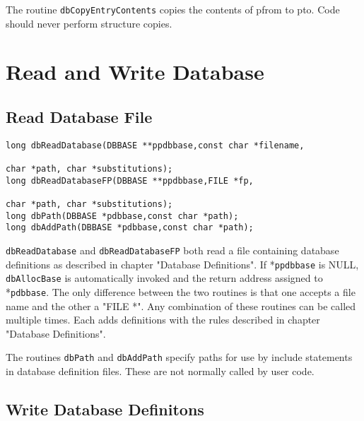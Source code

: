 The routine \verb|dbCopyEntryContents| copies the contents of pfrom to pto. Code should never perform structure copies.

\section{Read and Write Database}

\subsection{Read Database File}

\begin{verbatim}long dbReadDatabase(DBBASE **ppdbbase,const char *filename,

char *path, char *substitutions);
long dbReadDatabaseFP(DBBASE **ppdbbase,FILE *fp,

char *path, char *substitutions);
long dbPath(DBBASE *pdbbase,const char *path);
long dbAddPath(DBBASE *pdbbase,const char *path);

\end{verbatim}
\verb|dbReadDatabase| and \verb|dbReadDatabaseFP| both read a file containing database definitions as described in chapter 
"Database Definitions". If *\verb|ppdbbase| is NULL, \verb|dbAllocBase| is automatically invoked and the return address 
assigned to *\verb|pdbbase|. The only difference between the two routines is that one accepts a file name and the other a 
"FILE *". Any combination of these routines can be called multiple times. Each adds definitions with the rules described 
in chapter "Database Definitions".

The routines \verb|dbPath| and \verb|dbAddPath| specify paths for use by include statements in database definition files. These are 
not normally called by user code.

\subsection{Write Database Definitons}

